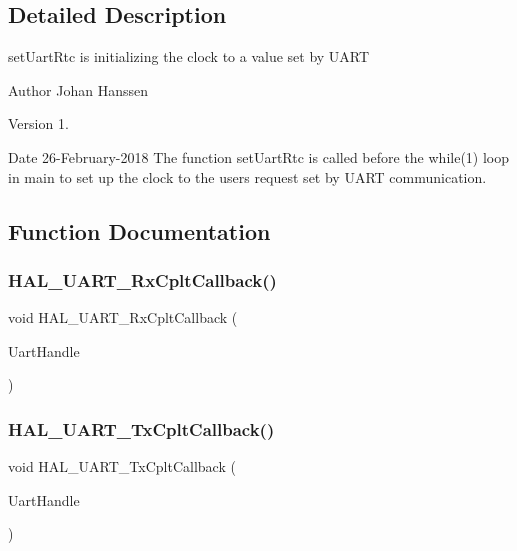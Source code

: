 \subsection{Detailed Description}
set\+Uart\+Rtc is initializing the clock to a value set by U\+A\+RT 

\begin{DoxyAuthor}{Author}
Johan Hanssen 
\end{DoxyAuthor}
\begin{DoxyVersion}{Version}
1. 
\end{DoxyVersion}
\begin{DoxyDate}{Date}
26-\/\+February-\/2018 The function set\+Uart\+Rtc is called before the while(1) loop in main to set up the clock to the users request set by U\+A\+RT communication. 
\end{DoxyDate}


\subsection{Function Documentation}
\mbox{\label{setuartrtc_8c_a64a600961d9507504c5d6af42adc6c67}} 
\subsubsection{H\+A\+L\+\_\+\+U\+A\+R\+T\+\_\+\+Rx\+Cplt\+Callback()}
{\footnotesize\ttfamily void H\+A\+L\+\_\+\+U\+A\+R\+T\+\_\+\+Rx\+Cplt\+Callback (\begin{DoxyParamCaption}\item[{U\+A\+R\+T\+\_\+\+Handle\+Type\+Def $\ast$}]{Uart\+Handle }\end{DoxyParamCaption})}

\mbox{\label{setuartrtc_8c_a7fdc88cab173073f3ee9d4af0b4e8c5f}} 
\subsubsection{H\+A\+L\+\_\+\+U\+A\+R\+T\+\_\+\+Tx\+Cplt\+Callback()}
{\footnotesize\ttfamily void H\+A\+L\+\_\+\+U\+A\+R\+T\+\_\+\+Tx\+Cplt\+Callback (\begin{DoxyParamCaption}\item[{U\+A\+R\+T\+\_\+\+Handle\+Type\+Def $\ast$}]{Uart\+Handle }\end{DoxyParamCaption})}

